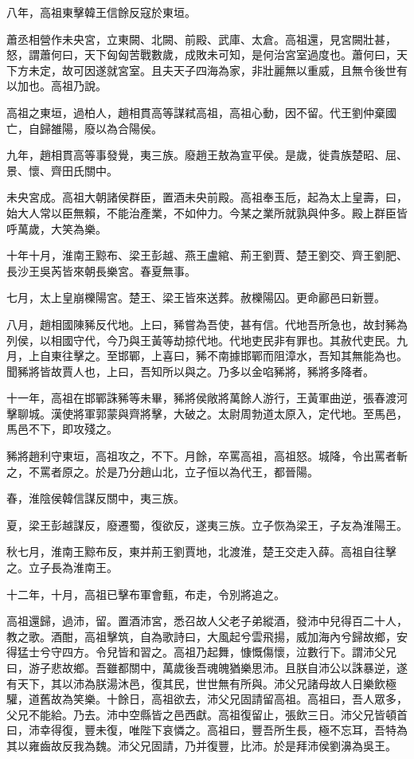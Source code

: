 八年，高祖東擊韓王信餘反寇於東垣。

蕭丞相營作未央宮，立東闕、北闕、前殿、武庫、太倉。高祖還，見宮闕壯甚，怒，謂蕭何曰，天下匈匈苦戰數歲，成敗未可知，是何治宮室過度也。蕭何曰，天下方未定，故可因遂就宮室。且夫天子四海為家，非壯麗無以重威，且無令後世有以加也。高祖乃說。

高祖之東垣，過柏人，趙相貫高等謀弒高祖，高祖心動，因不留。代王劉仲棄國亡，自歸雒陽，廢以為合陽侯。

九年，趙相貫高等事發覺，夷三族。廢趙王敖為宣平侯。是歲，徙貴族楚昭、屈、景、懷、齊田氏關中。

未央宮成。高祖大朝諸侯群臣，置酒未央前殿。高祖奉玉卮，起為太上皇壽，曰，始大人常以臣無賴，不能治產業，不如仲力。今某之業所就孰與仲多。殿上群臣皆呼萬歲，大笑為樂。

十年十月，淮南王黥布、梁王彭越、燕王盧綰、荊王劉賈、楚王劉交、齊王劉肥、長沙王吳芮皆來朝長樂宮。春夏無事。

七月，太上皇崩櫟陽宮。楚王、梁王皆來送葬。赦櫟陽囚。更命酈邑曰新豐。

八月，趙相國陳豨反代地。上曰，豨嘗為吾使，甚有信。代地吾所急也，故封豨為列侯，以相國守代，今乃與王黃等劫掠代地。代地吏民非有罪也。其赦代吏民。九月，上自東往擊之。至邯鄲，上喜曰，豨不南據邯鄲而阻漳水，吾知其無能為也。聞豨將皆故賈人也，上曰，吾知所以與之。乃多以金啗豨將，豨將多降者。

十一年，高祖在邯鄲誅豨等未畢，豨將侯敞將萬餘人游行，王黃軍曲逆，張春渡河擊聊城。漢使將軍郭蒙與齊將擊，大破之。太尉周勃道太原入，定代地。至馬邑，馬邑不下，即攻殘之。

豨將趙利守東垣，高祖攻之，不下。月餘，卒罵高祖，高祖怒。城降，令出罵者斬之，不罵者原之。於是乃分趙山北，立子恒以為代王，都晉陽。

春，淮陰侯韓信謀反關中，夷三族。

夏，梁王彭越謀反，廢遷蜀，復欲反，遂夷三族。立子恢為梁王，子友為淮陽王。

秋七月，淮南王黥布反，東并荊王劉賈地，北渡淮，楚王交走入薛。高祖自往擊之。立子長為淮南王。

十二年，十月，高祖已擊布軍會甀，布走，令別將追之。

高祖還歸，過沛，留。置酒沛宮，悉召故人父老子弟縱酒，發沛中兒得百二十人，教之歌。酒酣，高祖擊筑，自為歌詩曰，大風起兮雲飛揚，威加海內兮歸故鄉，安得猛士兮守四方。令兒皆和習之。高祖乃起舞，慷慨傷懷，泣數行下。謂沛父兄曰，游子悲故鄉。吾雖都關中，萬歲後吾魂魄猶樂思沛。且朕自沛公以誅暴逆，遂有天下，其以沛為朕湯沐邑，復其民，世世無有所與。沛父兄諸母故人日樂飲極驩，道舊故為笑樂。十餘日，高祖欲去，沛父兄固請留高祖。高祖曰，吾人眾多，父兄不能給。乃去。沛中空縣皆之邑西獻。高祖復留止，張飲三日。沛父兄皆頓首曰，沛幸得復，豐未復，唯陛下哀憐之。高祖曰，豐吾所生長，極不忘耳，吾特為其以雍齒故反我為魏。沛父兄固請，乃并復豐，比沛。於是拜沛侯劉濞為吳王。


